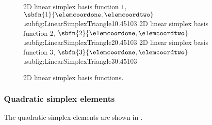 \begin{figure}[hbtp]
   \centering
     {2D linear simplex basis function $1$, $\sbfn{1}{\elemcoordone,\elemcoordtwo}$.}{subfig:LinearSimplexTriangle1}{0.45\linewidth}{10}{3}{}
   \hfil
     {2D linear simplex basis function $2$, $\sbfn{2}{\elemcoordone,\elemcoordtwo}$.}{subfig:LinearSimplexTriangle2}{0.45\linewidth}{10}{3}{}
   \hfil
     {2D linear simplex basis function $3$, $\sbfn{3}{\elemcoordone,\elemcoordtwo}$.}{subfig:LinearSimplexTriangle3}{0.45\linewidth}{10}{3}{}
   \caption[2D linear simplex basis functions.]{2D linear simplex basis functions.}
   \label{fig:LinearSimplexTriangleBasisFunctions}
\end{figure}
            


\subsubsection{Quadratic simplex elements}
\label{subsubsec:BasisFunctionsSimplexQuadratic}

The quadratic simplex elements are shown in .


